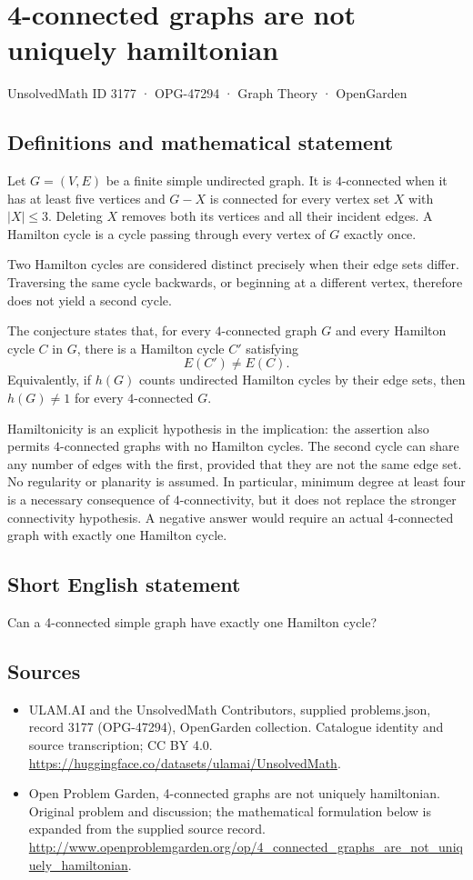 \documentclass[11pt,a4paper]{article}
\begin{document}
\section*{4-connected graphs are not uniquely hamiltonian}\label{3177}
{\small UnsolvedMath ID 3177 · OPG-47294 · Graph Theory · OpenGarden}
\subsection{Definitions and mathematical statement}
Let $G=(V,E)$ be a finite simple undirected graph.
It is $4$-connected when it has at least five vertices
and $G-X$ is connected for every vertex set $X$ with
$|X|\leq3$. Deleting $X$ removes both its vertices and
all their incident edges. A Hamilton cycle is a cycle
passing through every vertex of $G$ exactly once.

Two Hamilton cycles are considered distinct precisely
when their edge sets differ. Traversing the same cycle
backwards, or beginning at a different vertex, therefore
does not yield a second cycle.

The conjecture states that, for every $4$-connected graph
$G$ and every Hamilton cycle $C$ in $G$, there is a
Hamilton cycle $C'$ satisfying
\[
 E(C')\neq E(C).
\]
Equivalently, if $h(G)$ counts undirected Hamilton cycles
by their edge sets, then $h(G)\neq1$ for every
$4$-connected $G$.

Hamiltonicity is an explicit hypothesis in the implication:
the assertion also permits $4$-connected graphs with no
Hamilton cycles. The second cycle can share any number
of edges with the first, provided that they are not the
same edge set. No regularity or planarity is assumed.
In particular, minimum degree at least four is a necessary
consequence of $4$-connectivity, but it does not replace
the stronger connectivity hypothesis. A negative answer
would require an actual $4$-connected graph with exactly
one Hamilton cycle.
\subsection{Short English statement}
Can a 4-connected simple graph have exactly one Hamilton cycle?
\subsection{Sources}
\begin{itemize}
\item[S1] ULAM.AI and the UnsolvedMath Contributors, supplied problems.json, record 3177 (OPG-47294), OpenGarden collection. Catalogue identity and source transcription; CC BY 4.0.
\url{https://huggingface.co/datasets/ulamai/UnsolvedMath}.
\item[S2] Open Problem Garden, 4-connected graphs are not uniquely hamiltonian. Original problem and discussion; the mathematical formulation below is expanded from the supplied source record.
\url{http://www.openproblemgarden.org/op/4_connected_graphs_are_not_uniquely_hamiltonian}.
\end{itemize}
\end{document}
